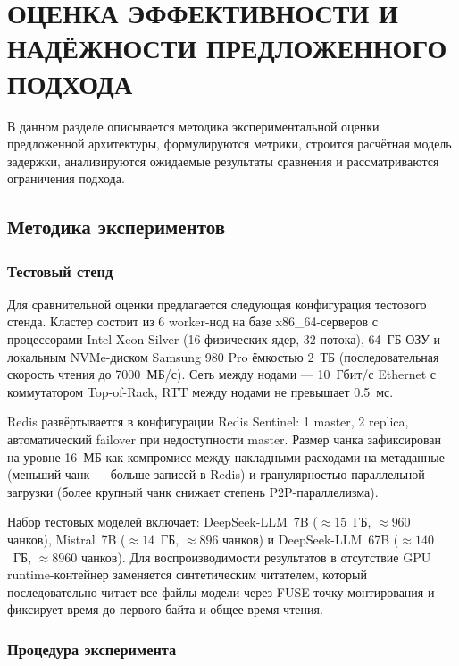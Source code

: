 \section{ОЦЕНКА ЭФФЕКТИВНОСТИ И НАДЁЖНОСТИ ПРЕДЛОЖЕННОГО ПОДХОДА}

В данном разделе описывается методика экспериментальной оценки предложенной архитектуры, формулируются метрики, строится расчётная модель задержки, анализируются ожидаемые результаты сравнения и рассматриваются ограничения подхода.

\subsection{Методика экспериментов}

\subsubsection{Тестовый стенд}

Для сравнительной оценки предлагается следующая конфигурация тестового стенда. Кластер состоит из 6 worker-нод на базе x86\_64-серверов с процессорами Intel Xeon Silver (16 физических ядер, 32 потока), 64~ГБ ОЗУ и локальным NVMe-диском Samsung 980 Pro ёмкостью 2~ТБ (последовательная скорость чтения до 7000~МБ/с). Сеть между нодами --- 10~Гбит/с Ethernet с коммутатором Top-of-Rack, RTT между нодами не превышает 0.5~мс.

Redis развёртывается в конфигурации Redis Sentinel: 1 master, 2 replica, автоматический failover при недоступности master. Размер чанка зафиксирован на уровне 16~МБ как компромисс между накладными расходами на метаданные (меньший чанк --- больше записей в Redis) и гранулярностью параллельной загрузки (более крупный чанк снижает степень P2P-параллелизма).

Набор тестовых моделей включает: DeepSeek-LLM~7B ($\approx 15$~ГБ, $\approx 960$ чанков), Mistral~7B ($\approx 14$~ГБ, $\approx 896$ чанков) и DeepSeek-LLM~67B ($\approx 140$~ГБ, $\approx 8960$ чанков). Для воспроизводимости результатов в отсутствие GPU runtime-контейнер заменяется синтетическим читателем, который последовательно читает все файлы модели через FUSE-точку монтирования и фиксирует время до первого байта и общее время чтения.

\subsubsection{Процедура эксперимента}

